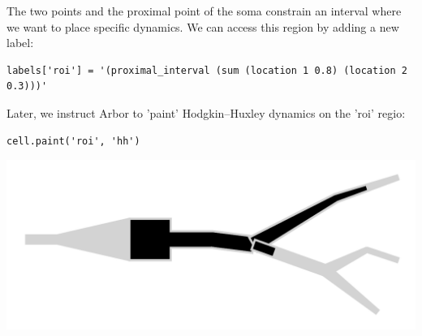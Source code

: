 \documentclass{beamer}
\newcommand*\circled[1]{\tikz[baseline=(char.base)]{\node[shape=circle,fill,inner sep=2pt] (char) {\textcolor{white}{#1}};}} %
\begin{document}
\begin{frame}[t, fragile]
\begin{columns}[onlytextwidth,T]
        \begin{column}{0.3\textwidth}
          \circled{3} The two points and the proximal point of the soma constrain an interval where we want to place specific dynamics. We can access this region by adding a new label:
\begin{verbatim}
labels['roi'] = '(proximal_interval (sum (location 1 0.8) (location 2 0.3)))'
\end{verbatim}
          Later, we instruct Arbor to 'paint' Hodgkin–Huxley dynamics on the 'roi' regio:
\begin{verbatim}
cell.paint('roi', 'hh')
\end{verbatim}
          \begin{center}\includegraphics[width=0.8\linewidth]{scripts/region.pdf}\end{center}
        \end{column}

      \end{columns}


\end{frame}
\end{document}
